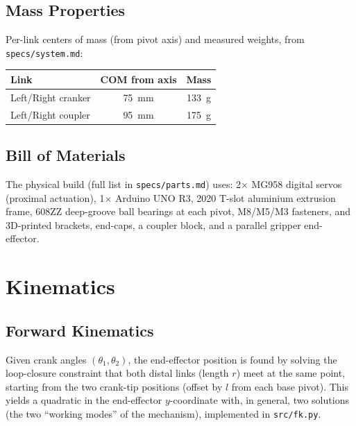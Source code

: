 \documentclass[11pt]{article}
\begin{document}

\subsection{Mass Properties}

Per-link centers of mass (from pivot axis) and measured weights, from \texttt{specs/system.md}:

\begin{center}
\begin{tabular}{lcc}
\hline
Link & COM from axis & Mass \\
\hline
Left/Right cranker & 75~mm & 133~g \\
Left/Right coupler  & 95~mm & 175~g \\
\hline
\end{tabular}
\end{center}

\subsection{Bill of Materials}

The physical build (full list in \texttt{specs/parts.md}) uses: 2$\times$ MG958 digital servos (proximal actuation), 1$\times$ Arduino UNO R3, 2020 T-slot aluminium extrusion frame, 608ZZ deep-groove ball bearings at each pivot, M8/M5/M3 fasteners, and 3D-printed brackets, end-caps, a coupler block, and a parallel gripper end-effector.

\section{Kinematics}

\subsection{Forward Kinematics}

Given crank angles $(\theta_1, \theta_2)$, the end-effector position is found by solving the loop-closure constraint that both distal links (length $r$) meet at the same point, starting from the two crank-tip positions (offset by $l$ from each base pivot). This yields a quadratic in the end-effector $y$-coordinate with, in general, two solutions (the two ``working modes'' of the mechanism), implemented in \texttt{src/fk.py}.
\end{document}
